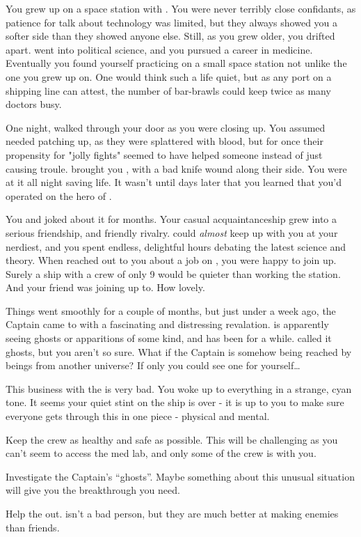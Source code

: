 \documentclass[char]{TMFHope}
\begin{document}
\name{\cMed{}}

You grew up on a space station with \cDip{}. You were never terribly close confidants, as \cDip{\their} patience for talk about technology was limited, but they always showed you a softer side than they showed anyone else. Still, as you grew older, you drifted apart. \cDip{} went into political science, and you pursued a career in medicine. Eventually you found yourself practicing on a small space station not unlike the one you grew up on. One would think such a life quiet, but as any port on a shipping line can attest, the number of bar-brawls could keep twice as many doctors busy.

One night, \cSci{} walked through your door as you were closing up. You assumed \cSci{\they} needed patching up, as they were splattered with blood, but for once their propensity for "jolly fights" seemed to have helped someone instead of just causing troule. \cSci{\They} brought you \cCap{}, with a bad knife wound along their side. You were at it all night saving \cCap{\their} life. It wasn't until days later that you learned that you'd operated on the hero of \pBattle{}.

You and \cSci{} joked about it for months. Your casual acquaintanceship grew into a serious friendship, and friendly rivalry. \cSci{} could \emph{almost} keep up with you at your nerdiest, and you spent endless, delightful hours debating the latest science and theory. When \cCap{} reached out to you about a job on \pNew{}, you were happy to join up. Surely a ship with a crew of only 9 would be quieter than working the station. And your friend \cSci{} was joining up to. How lovely.

Things went smoothly for a couple of months, but just under a week ago, the Captain came to with a fascinating and distressing revalation. \cCap{} is apparently seeing ghosts or apparitions of some kind, and has been for a while. \cCap{\They} called it ghosts, but you aren't so sure. What if the Captain is somehow being reached by beings from another universe? If only you could see one for yourself\ldots

This business with the \pNew{} is very bad. You woke up to everything in a strange, cyan tone. It seems your quiet stint on the ship is over - it is up to you to make sure everyone gets through this in one piece - physical and mental.

\begin{itemz}[Goals]
	\item Keep the crew as healthy and safe as possible. This will be challenging as you can't seem to access the med lab, and only some of the crew is with you.
	\item Investigate the Captain's ``ghosts''. Maybe something about this unusual situation will give you the breakthrough you need.
	\item Help the \cDip{} out. \cDip{\They} isn't a bad person, but they are much better at making enemies than friends.
\end{itemz}
\end{document}
